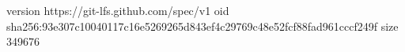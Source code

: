 version https://git-lfs.github.com/spec/v1
oid sha256:93e307c10040117c16e5269265d843ef4c29769c48e52fcf88fad961cccf249f
size 349676
